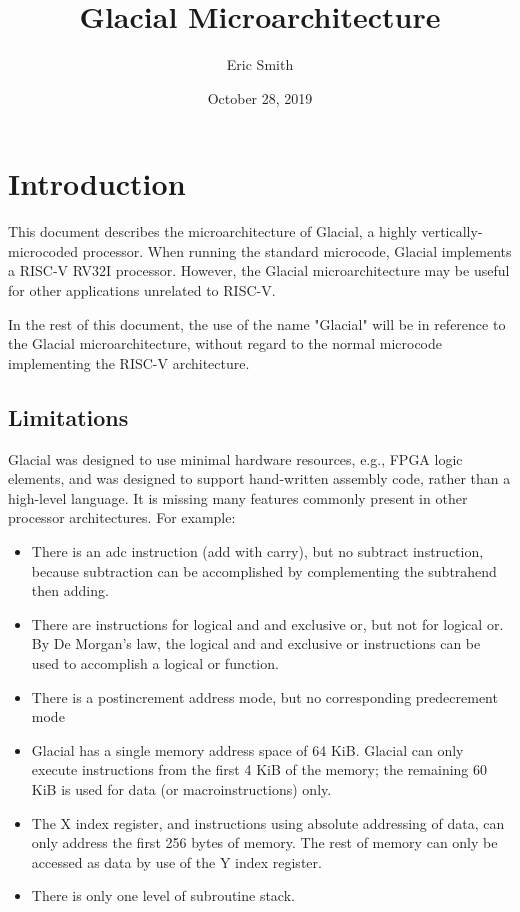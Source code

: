 \documentclass[letterpaper]{report}
\begin{document}
\title{Glacial Microarchitecture}
\author{Eric Smith}
\date{October 28, 2019}
\maketitle

\chapter{Introduction}

This document describes the microarchitecture of Glacial, a highly
vertically-microcoded processor. When running the standard microcode,
Glacial implements a RISC-V RV32I processor. However, the Glacial
microarchitecture may be useful for other applications unrelated to
RISC-V.

In the rest of this document, the use of the name "Glacial" will be
in reference to the Glacial microarchitecture, without regard to
the normal microcode implementing the RISC-V architecture.

\section{Limitations}

Glacial was designed to use minimal hardware resources, e.g., FPGA
logic elements, and was designed to support hand-written assembly code,
rather than a high-level language. It is missing many features
commonly present in other processor architectures. For example:

\begin{itemize}
  \item There is an adc instruction (add with carry), but no subtract
instruction, because subtraction can be accomplished by complementing
the subtrahend then adding.

  \item There are instructions for logical and and exclusive or, but not for
logical or. By De Morgan's law, the logical and and exclusive or
instructions can be used to accomplish a logical or function.

  \item There is a postincrement address mode, but no corresponding predecrement
mode

  \item Glacial has a single memory address space of 64 KiB. Glacial can only
execute instructions from the first 4 KiB of the memory; the remaining
60 KiB is used for data (or macroinstructions) only.

  \item The X index register, and instructions using absolute addressing of data,
can only address the first 256 bytes of memory. The rest of memory can
only be accessed as data by use of the Y index register.

  \item There is only one level of subroutine stack.
\end{itemize}
\end{document}
